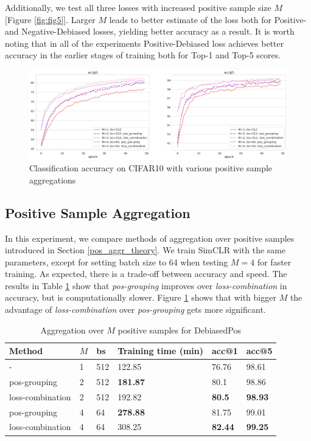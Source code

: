 \documentclass{article}
\begin{document}
Additionally, we test all three losses with increased positive sample size $M$ [Figure \ref{fig:fig5}]. Larger $M$ leads to better estimate of the loss both for Positive- and Negative-Debiased losses, yielding better accuracy as a result. It is worth noting that in all of the experiments Positive-Debiased loss achieves better accuracy in the earlier stages of training both for Top-1 and Top-5 scores.

\begin{figure}
\includegraphics[width=1\textwidth]{figures/pg_vs_lc.png}
\caption{Classification accuracy on CIFAR10 with various positive sample aggregations}
\label{fig:fig6}
\end{figure}

\subsection{Positive Sample Aggregation} \label{pos_aggr}
In this experiment, we compare methods of aggregation over positive samples introduced in Section \ref{pos_aggr_theory}. We train SimCLR with the same parameters, except for setting batch size to 64 when testing $M=4$ for faster training. As expected, there is a trade-off between accuracy and speed. The results in Table \ref{tab:table} show that \textit{pos-grouping} improves over \textit{loss-combination} in accuracy, but is computationally slower. Figure \ref{fig:fig6} shows that with bigger $M$ the advantage of \textit{loss-combination} over \textit{pos-grouping} gets more significant. 

\begin{table}
    \caption{Aggregation over $M$ positive samples for DebiasedPos}
    \centering
    \begin{tabular}{llllll}
        \toprule
        Method  & $M$ & bs    & Training time (min)   & acc@1 & acc@5\\
        \midrule
        -   & 1 & 512   & 122.85    & 76.76 & 98.61\\
        \midrule
        pos-grouping    & 2 & 512   & \textbf{181.87}   & 80.1  & 98.86\\
        loss-combination    & 2 & 512   & 192.82    & \textbf{80.5} & \textbf{98.93}\\
        \midrule
        pos-grouping    & 4 & 64    & \textbf{278.88}   & 81.75 & 99.01\\
        loss-combination    & 4 & 64    & 308.25    & \textbf{82.44} & \textbf{99.25}\\
        \bottomrule
    \end{tabular}
    \label{tab:table}
\end{table}
\end{document}
